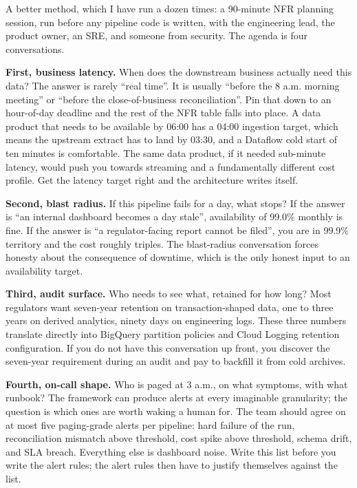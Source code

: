 \documentclass[
  11pt,
  british,
  oneside]{book}
\begin{document}
A better method, which I have run a dozen times: a 90-minute NFR
planning session, run before any pipeline code is written, with the
engineering lead, the product owner, an SRE, and someone from security.
The agenda is four conversations.

\textbf{First, business latency.} When does the downstream business
actually need this data? The answer is rarely ``real time''. It is
usually ``before the 8 a.m. morning meeting'' or ``before the
close-of-business reconciliation''. Pin that down to an hour-of-day
deadline and the rest of the NFR table falls into place. A data product
that needs to be available by 06:00 has a 04:00 ingestion target, which
means the upstream extract has to land by 03:30, and a Dataflow cold
start of ten minutes is comfortable. The same data product, if it needed
sub-minute latency, would push you towards streaming and a fundamentally
different cost profile. Get the latency target right and the
architecture writes itself.

\textbf{Second, blast radius.} If this pipeline fails for a day, what
stops? If the answer is ``an internal dashboard becomes a day stale'',
availability of 99.0\% monthly is fine. If the answer is ``a
regulator-facing report cannot be filed'', you are in 99.9\% territory
and the cost roughly triples. The blast-radius conversation forces
honesty about the consequence of downtime, which is the only honest
input to an availability target.

\textbf{Third, audit surface.} Who needs to see what, retained for how
long? Most regulators want seven-year retention on transaction-shaped
data, one to three years on derived analytics, ninety days on
engineering logs. These three numbers translate directly into BigQuery
partition policies and Cloud Logging retention configuration. If you do
not have this conversation up front, you discover the seven-year
requirement during an audit and pay to backfill it from cold archives.

\textbf{Fourth, on-call shape.} Who is paged at 3 a.m., on what
symptoms, with what runbook? The framework can produce alerts at every
imaginable granularity; the question is which ones are worth waking a
human for. The team should agree on at most five paging-grade alerts per
pipeline: hard failure of the run, reconciliation mismatch above
threshold, cost spike above threshold, schema drift, and SLA breach.
Everything else is dashboard noise. Write this list before you write the
alert rules; the alert rules then have to justify themselves against the
list.
\end{document}
